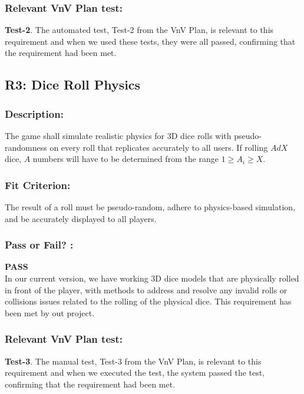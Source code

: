 \documentclass[12pt, titlepage]{article}
\begin{document}
 \subsubsection*{Relevant VnV Plan test: }  \textbf{ Test-2}. The automated test, Test-2 from the VnV Plan, is relevant to this requirement and when we used these tests, they were all passed, confirming that the requirement had been met.


\subsection{R3: Dice Roll Physics} 
\label{R3}  
  
\subsubsection*{Description:}The game shall simulate realistic physics for 3D dice rolls with pseudo-randomness on every roll that replicates accurately to all users. If rolling $AdX$ dice, $A$ numbers will have to be determined from the range $1 \geq A_{i} \geq X$.

\subsubsection*{Fit Criterion:} The result of a roll must be pseudo-random, adhere to physics-based simulation, and be accurately displayed to all players.

\subsubsection*{Pass or Fail? :} 

 \noindent \textbf{PASS}\\
 
 In our current version, we have working 3D dice models that are physically rolled in front of the player, with methods to address and resolve any invalid rolls or collisions issues related to the rolling of the physical dice.  This requirement has been met by out project.

 \subsubsection*{Relevant VnV Plan test: }  \textbf{ Test-3}. The manual test, Test-3 from the VnV Plan, is relevant to this requirement and when we executed the test, the system passed the test, confirming that the requirement had been met.
\end{document}
